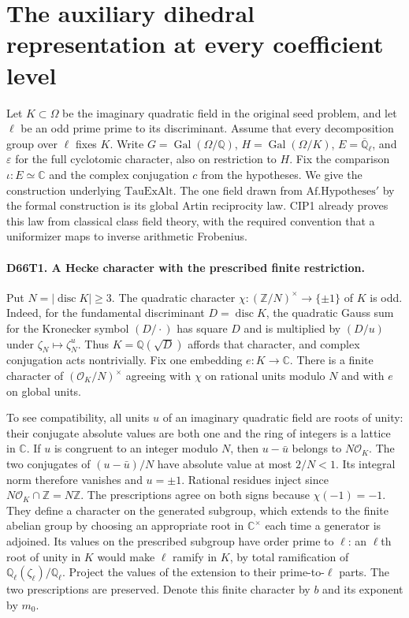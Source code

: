 \section{The auxiliary dihedral representation at every coefficient level}

Let $K\subset\Omega$ be the imaginary quadratic field in the original
seed problem, and let $\ell$ be an odd prime prime to its discriminant.
Assume that every decomposition group over $\ell$ fixes $K$. Write
$G=\operatorname{Gal}(\Omega/\mathbb Q)$, $H=\operatorname{Gal}(\Omega/K)$,
$E=\overline{\mathbb Q}_\ell$, and $\varepsilon$ for the full cyclotomic
character, also on restriction to $H$. Fix the comparison
$\iota:E\simeq\mathbb C$ and the complex conjugation $c$ from the
hypotheses. We give the construction underlying $\mathrm{TauExAlt}$.
The one field drawn from $\mathrm{Af.Hypotheses}'$ by the formal
construction is its global Artin reciprocity law. CIP1 already
proves this law from classical class field theory, with the required
convention that a uniformizer maps to inverse arithmetic Frobenius.

\paragraph{D66T1. A Hecke character with the prescribed finite restriction.}
Put $N=|\operatorname{disc} K|\ge3$. The quadratic character
$\chi:(\mathbb Z/N)^\times\to\{\pm1\}$ of $K$ is odd.
Indeed, for the fundamental discriminant $D=\operatorname{disc} K$,
the quadratic Gauss sum for the Kronecker symbol $(D/\cdot)$ has
square $D$ and is multiplied by $(D/u)$ under $\zeta_N\mapsto\zeta_N^u$.
Thus $K=\mathbb Q(\sqrt D)$ affords that character, and complex
conjugation acts nontrivially. Fix one embedding $e:K\to\mathbb C$.
There is a finite character of $(\mathcal O_K/N)^\times$ agreeing
with $\chi$ on rational units modulo $N$ and with $e$ on global units.

To see compatibility, all units $u$ of an imaginary quadratic field
are roots of unity: their conjugate absolute values are both one and
the ring of integers is a lattice in $\mathbb C$. If $u$ is congruent
to an integer modulo $N$, then $u-\bar u$ belongs to $N\mathcal O_K$.
The two conjugates of $(u-\bar u)/N$ have absolute value at most
$2/N<1$. Its integral norm therefore vanishes and $u=\pm1$.
Rational residues inject since $N\mathcal O_K\cap\mathbb Z=N\mathbb Z$.
The prescriptions agree on both signs because $\chi(-1)=-1$.
They define a character on the generated subgroup, which extends to
the finite abelian group by choosing an appropriate root in
$\mathbb C^\times$ each time a generator is adjoined. Its values on
the prescribed subgroup have order prime to $\ell$: an $\ell$th root
of unity in $K$ would make $\ell$ ramify in $K$, by total ramification
of $\mathbb Q_\ell(\zeta_\ell)/\mathbb Q_\ell$. Project the values of
the extension to their prime-to-$\ell$ parts. The two prescriptions
are preserved. Denote this finite character by $b$ and its exponent by $m_0$.


